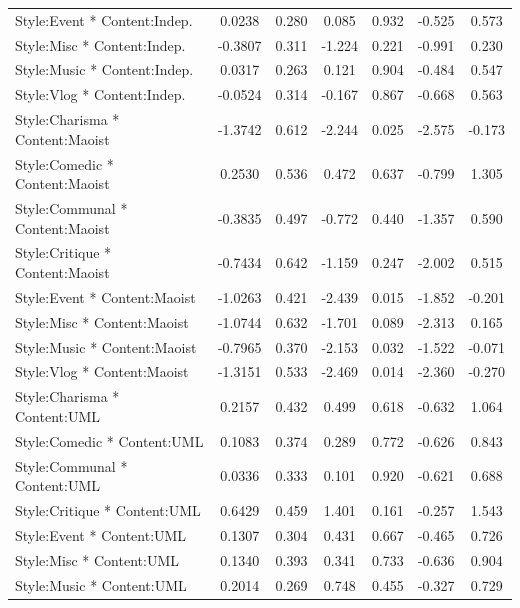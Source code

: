 \documentclass[12pt,a4paper]{report}
\begin{document}
\begin{table}
\begin{tabular}{@{}l S[table-format=-1.4] S[table-format=1.3] S[table-format=-1.3] S[table-format=1.3] S[table-format=-1.3] S[table-format=1.3]@{}}
        Style:Event * Content:Indep.         & 0.0238  & 0.280 & 0.085  & 0.932 & -0.525 & 0.573 \\
        Style:Misc * Content:Indep.          & -0.3807 & 0.311 & -1.224 & 0.221 & -0.991 & 0.230 \\
        Style:Music * Content:Indep.         & 0.0317  & 0.263 & 0.121  & 0.904 & -0.484 & 0.547 \\
        Style:Vlog * Content:Indep.          & -0.0524 & 0.314 & -0.167 & 0.867 & -0.668 & 0.563 \\ \addlinespace
        Style:Charisma * Content:Maoist      & -1.3742 & 0.612 & -2.244 & 0.025 & -2.575 & -0.173 \\
        Style:Comedic * Content:Maoist       & 0.2530  & 0.536 & 0.472  & 0.637 & -0.799 & 1.305 \\
        Style:Communal * Content:Maoist      & -0.3835 & 0.497 & -0.772 & 0.440 & -1.357 & 0.590 \\
        Style:Critique * Content:Maoist      & -0.7434 & 0.642 & -1.159 & 0.247 & -2.002 & 0.515 \\
        Style:Event * Content:Maoist         & -1.0263 & 0.421 & -2.439 & 0.015 & -1.852 & -0.201 \\
        Style:Misc * Content:Maoist          & -1.0744 & 0.632 & -1.701 & 0.089 & -2.313 & 0.165 \\
        Style:Music * Content:Maoist         & -0.7965 & 0.370 & -2.153 & 0.032 & -1.522 & -0.071 \\
        Style:Vlog * Content:Maoist          & -1.3151 & 0.533 & -2.469 & 0.014 & -2.360 & -0.270 \\ \addlinespace
        Style:Charisma * Content:UML         & 0.2157  & 0.432 & 0.499  & 0.618 & -0.632 & 1.064 \\
        Style:Comedic * Content:UML          & 0.1083  & 0.374 & 0.289  & 0.772 & -0.626 & 0.843 \\
        Style:Communal * Content:UML         & 0.0336  & 0.333 & 0.101  & 0.920 & -0.621 & 0.688 \\
        Style:Critique * Content:UML         & 0.6429  & 0.459 & 1.401  & 0.161 & -0.257 & 1.543 \\
        Style:Event * Content:UML            & 0.1307  & 0.304 & 0.431  & 0.667 & -0.465 & 0.726 \\
        Style:Misc * Content:UML             & 0.1340  & 0.393 & 0.341  & 0.733 & -0.636 & 0.904 \\
        Style:Music * Content:UML            & 0.2014  & 0.269 & 0.748  & 0.455 & -0.327 & 0.729 \\

\end{tabular}
\end{table}
\end{document}
